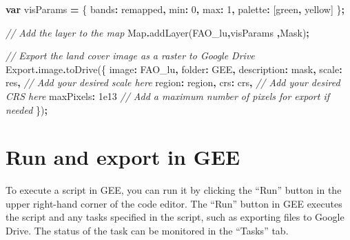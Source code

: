 \documentclass[
  10pt,
  b5paper,
  oneside]{book}
\newenvironment{Shaded}{\begin{snugshade}}{\end{snugshade}}
\newcommand{\AttributeTok}[1]{\textcolor[rgb]{0.77,0.63,0.00}{#1}}
\newcommand{\BuiltInTok}[1]{#1}
\newcommand{\CommentTok}[1]{\textcolor[rgb]{0.56,0.35,0.01}{\textit{#1}}}
\newcommand{\DataTypeTok}[1]{\textcolor[rgb]{0.13,0.29,0.53}{#1}}
\newcommand{\DecValTok}[1]{\textcolor[rgb]{0.00,0.00,0.81}{#1}}
\newcommand{\FloatTok}[1]{\textcolor[rgb]{0.00,0.00,0.81}{#1}}
\newcommand{\FunctionTok}[1]{\textcolor[rgb]{0.00,0.00,0.00}{#1}}
\newcommand{\KeywordTok}[1]{\textcolor[rgb]{0.13,0.29,0.53}{\textbf{#1}}}
\newcommand{\NormalTok}[1]{#1}
\newcommand{\OperatorTok}[1]{\textcolor[rgb]{0.81,0.36,0.00}{\textbf{#1}}}
\newcommand{\StringTok}[1]{\textcolor[rgb]{0.31,0.60,0.02}{#1}}
\begin{document}
\begin{Shaded}
\begin{Highlighting}[]
\KeywordTok{var}\NormalTok{ visParams }\OperatorTok{=}\NormalTok{ \{}
  \DataTypeTok{bands}\OperatorTok{:} \StringTok{\textquotesingle{}remapped\textquotesingle{}}\OperatorTok{,}
  \DataTypeTok{min}\OperatorTok{:} \DecValTok{0}\OperatorTok{,}
  \DataTypeTok{max}\OperatorTok{:} \DecValTok{1}\OperatorTok{,}
  \DataTypeTok{palette}\OperatorTok{:}\NormalTok{ [}\StringTok{\textquotesingle{}green\textquotesingle{}}\OperatorTok{,} \StringTok{\textquotesingle{}yellow\textquotesingle{}}\NormalTok{]}
\NormalTok{\}}\OperatorTok{;}

\CommentTok{// Add the layer to the map}
\BuiltInTok{Map}\OperatorTok{.}\FunctionTok{addLayer}\NormalTok{(FAO\_lu}\OperatorTok{,}\NormalTok{visParams }\OperatorTok{,}\StringTok{\textquotesingle{}Mask\textquotesingle{}}\NormalTok{)}\OperatorTok{;}

\CommentTok{// Export the land cover image as a raster to Google Drive}
\NormalTok{Export}\OperatorTok{.}\AttributeTok{image}\OperatorTok{.}\FunctionTok{toDrive}\NormalTok{(\{}
  \DataTypeTok{image}\OperatorTok{:}\NormalTok{ FAO\_lu}\OperatorTok{,}
  \DataTypeTok{folder}\OperatorTok{:} \StringTok{\textquotesingle{}GEE\textquotesingle{}}\OperatorTok{,}
  \DataTypeTok{description}\OperatorTok{:} \StringTok{\textquotesingle{}mask\textquotesingle{}}\OperatorTok{,}
  \DataTypeTok{scale}\OperatorTok{:}\NormalTok{ res}\OperatorTok{,} \CommentTok{// Add your desired scale here}
  \DataTypeTok{region}\OperatorTok{:}\NormalTok{ region}\OperatorTok{,}
  \DataTypeTok{crs}\OperatorTok{:}\NormalTok{ crs}\OperatorTok{,} \CommentTok{// Add your desired CRS here}
  \DataTypeTok{maxPixels}\OperatorTok{:} \FloatTok{1e13} \CommentTok{// Add a maximum number of pixels for export if needed}
\NormalTok{\})}\OperatorTok{;}
\end{Highlighting}
\end{Shaded}

\hypertarget{run-and-export-in-gee}{%
\section{Run and export in GEE}\label{run-and-export-in-gee}}

To execute a script in GEE, you can run it by clicking the ``Run'' button in the upper right-hand corner of the code editor. The ``Run'' button in GEE executes the script and any tasks specified in the script, such as exporting files to Google Drive. The status of the task can be monitored in the ``Tasks'' tab.
\end{document}
